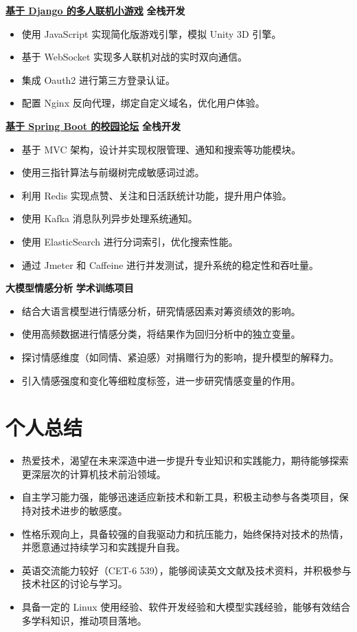 \documentclass{resume}
\begin{document}
\textbf{\href{https://app6534.acapp.acwing.com.cn/}{基于 Django 的多人联机小游戏}} \hfill \textbf{全栈开发}
\begin{itemize}
    \item 使用 JavaScript 实现简化版游戏引擎，模拟 Unity 3D 引擎。
    \item 基于 WebSocket 实现多人联机对战的实时双向通信。
    \item 集成 Oauth2 进行第三方登录认证。
    \item 配置 Nginx 反向代理，绑定自定义域名，优化用户体验。
\end{itemize}

\textbf{\href{http://116.198.216.39/}{基于 Spring Boot 的校园论坛}} \hfill \textbf{全栈开发}
\begin{itemize}
    \item 基于 MVC 架构，设计并实现权限管理、通知和搜索等功能模块。
    \item 使用三指针算法与前缀树完成敏感词过滤。
    \item 利用 Redis 实现点赞、关注和日活跃统计功能，提升用户体验。
    \item 使用 Kafka 消息队列异步处理系统通知。
    \item 使用 ElasticSearch 进行分词索引，优化搜索性能。
    \item 通过 Jmeter 和 Caffeine 进行并发测试，提升系统的稳定性和吞吐量。
\end{itemize}

\textbf{大模型情感分析} \hfill \textbf{学术训练项目}
\begin{itemize}
    \item 结合大语言模型进行情感分析，研究情感因素对筹资绩效的影响。
    \item 使用高频数据进行情感分类，将结果作为回归分析中的独立变量。
    \item 探讨情感维度（如同情、紧迫感）对捐赠行为的影响，提升模型的解释力。
    \item 引入情感强度和变化等细粒度标签，进一步研究情感变量的作用。
\end{itemize}

\section{个人总结}

\begin{itemize}
    \item 热爱技术，渴望在未来深造中进一步提升专业知识和实践能力，期待能够探索更深层次的计算机技术前沿领域。
    \item 自主学习能力强，能够迅速适应新技术和新工具，积极主动参与各类项目，保持对技术进步的敏感度。
    \item 性格乐观向上，具备较强的自我驱动力和抗压能力，始终保持对技术的热情，并愿意通过持续学习和实践提升自我。
    \item 英语交流能力较好（CET-6 539），能够阅读英文文献及技术资料，并积极参与技术社区的讨论与学习。
    \item 具备一定的 Linux 使用经验、软件开发经验和大模型实践经验，能够有效结合多学科知识，推动项目落地。
\end{itemize}
\end{document}
